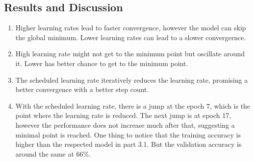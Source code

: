 \documentclass[3p,times,procedia]{elsarticle}
\begin{document}
\subsection{\textbf{Results and Discussion}}
\begin{enumerate}
    \item Higher learning rates lead to faster convergence, however the model can skip the global minimum. Lower learning rates can lead to a slower convergernce.
    \item High learning rate might not get to the minimum point but oscillate around it. Lower has better chance to get to the minimum point.
    \item The scheduled learning rate iteratively reduces the learning rate, promising a better convergence with a better step count.
    \item With the scheduled learning rate, there is a jump at the epoch 7, which is the point where the learning rate is reduced.
    The next jump is at epoch 17, however the performance does not increase much after that, suggesting a minimal point is reached.
    One thing to notice that the training accuracy is higher than the respected model in part 3.1.
    But the validation accuracy is around the same at 66\%.

\end{enumerate}




\end{document}
